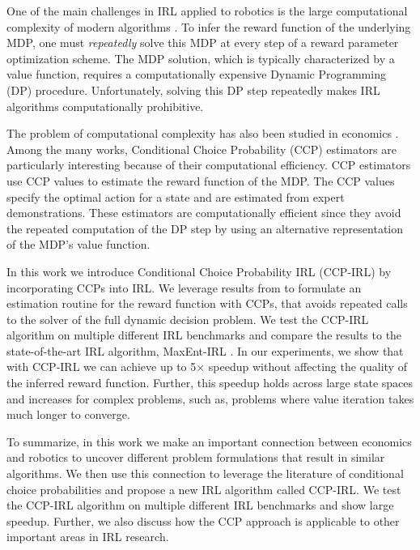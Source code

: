 \documentclass{article}
\begin{document}
One of the main challenges in IRL applied to robotics is the large computational complexity of modern algorithms \cite{ziebart, Ratliff2006}. To infer the reward function of the underlying MDP, one must \textit{repeatedly} solve this MDP at every step of a reward parameter optimization scheme. The MDP solution, which is typically characterized by a value function, requires a computationally expensive Dynamic Programming (DP) procedure. Unfortunately, solving this DP step repeatedly makes IRL algorithms computationally prohibitive.

The problem of computational complexity has also been studied in economics \cite{hotz, su2012constrained, aguirregabiria2002swapping}. Among the many works, Conditional Choice Probability (CCP) estimators \cite{hotz} are particularly interesting because of their computational efficiency.
CCP estimators use CCP values to estimate the reward function of the MDP.
The CCP values specify the optimal action for a state and are estimated from expert demonstrations. These estimators are computationally efficient since they avoid the repeated computation of the DP step by using an alternative representation of the MDP's value function.

In this work we introduce Conditional Choice Probability IRL (CCP-IRL) by incorporating CCPs into IRL. We leverage results from \cite{rust_gmc, hotz, magnac} to formulate an estimation routine for the reward function with CCPs, that avoids repeated calls to the solver of the full dynamic decision problem. We test the CCP-IRL algorithm on multiple different IRL benchmarks and compare the results to the state-of-the-art IRL algorithm, MaxEnt-IRL \cite{ziebart}. In our experiments, we show that with CCP-IRL we can achieve up to 5$\times$ speedup without affecting the quality of the inferred reward function. Further, this speedup holds across large state spaces and increases for complex problems, such as, problems where value iteration takes much longer to converge. 

To summarize, in this work we make an important connection between economics and robotics to uncover different problem formulations that result in similar algorithms. We then use this connection to leverage the literature of conditional choice probabilities and propose a new IRL algorithm called CCP-IRL. We test the CCP-IRL algorithm on multiple different IRL benchmarks and show large speedup. Further, we also discuss how the CCP approach is applicable to other important areas in IRL research.
\end{document}
